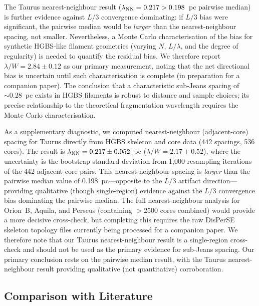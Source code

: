 \documentclass[twoside,twocolumn]{mnras}
\begin{document}
The Taurus nearest-neighbour result ($\lambda_{\rm NN} = 0.217 > 0.198$~pc pairwise
median) is further evidence against $L/3$ convergence dominating: if $L/3$ bias were
significant, the pairwise median would be \textit{larger} than the nearest-neighbour
spacing, not smaller. Nevertheless, a Monte Carlo characterisation of the bias for
synthetic HGBS-like filament geometries (varying $N$, $L/\lambda$, and the degree of
regularity) is needed to quantify the residual bias. We therefore report $\lambda/W = 2.84
\pm 0.12$ as our primary measurement, noting that the net directional bias is uncertain
until such characterisation is complete (in preparation for a companion paper). The
conclusion that a characteristic sub-Jeans spacing of $\sim 0.28$~pc exists in HGBS
filaments is robust to distance and sample choices; its precise relationship to the
theoretical fragmentation wavelength requires the Monte Carlo characterisation.

As a supplementary diagnostic, we computed nearest-neighbour (adjacent-core) spacing
for Taurus directly from HGBS skeleton and core data (442 spacings, 536 cores).
The result is $\lambda_{\rm NN} = 0.217 \pm 0.052$~pc ($\lambda/W = 2.17 \pm 0.52$),
where the uncertainty is the bootstrap standard deviation from 1,000 resampling
iterations of the 442 adjacent-core pairs. This nearest-neighbour spacing is
\textit{larger} than the pairwise median value of 0.198~pc---opposite to the
$L/3$ artifact direction---providing qualitative (though single-region) evidence
against the $L/3$ convergence bias dominating the pairwise median.
The full nearest-neighbour analysis for Orion~B, Aquila, and Perseus (containing
$>2500$ cores combined) would provide a more decisive cross-check, but completing
this requires the raw DisPerSE skeleton topology files currently being processed for
a companion paper. We therefore note that our Taurus nearest-neighbour result is a
single-region cross-check and should not be used as the primary evidence for sub-Jeans
spacing. Our primary conclusion rests on the pairwise median result, with the Taurus
nearest-neighbour result providing qualitative (not quantitative) corroboration.

\subsection{Comparison with Literature}
\end{document}
